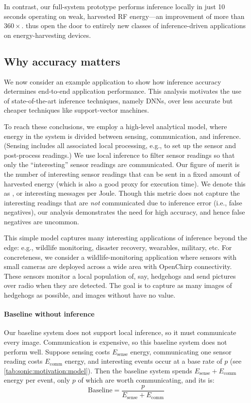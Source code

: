 In contrast, our full-system \sonic prototype performs inference locally
in just 10 seconds operating on weak, harvested RF energy---an
improvement of more than $360\times$. 
%
\sonictails thus open the door to entirely new classes of inference-driven
applications on energy-harvesting devices.

\subsection{Why accuracy matters}

We now consider an example application to show how
inference accuracy determines end-to-end application performance.
%
This analysis motivates the use of state-of-the-art inference
techniques, namely DNNs, over less accurate but
cheaper techniques like support-vector machines.

To reach these conclusions, we employ a high-level analytical model,
where energy in the system is divided between
sensing, communication, and inference.
%
(Sensing includes all associated local processing, e.g., to set up the
sensor and post-process readings.)
%
We use local inference to filter sensor readings so that only the
``interesting'' sensor readings are communicated.
%
Our figure of merit is the number of interesting sensor readings
that can be sent in a fixed amount of harvested energy
(which is also a good proxy for execution time).
%
We denote this as \metric, or interesting messages per Joule.
%
Though this metric does not capture the interesting readings that are
\emph{not} communicated due to inference error (i.e., false
negatives), our analysis demonstrates the need for high accuracy,
and hence false negatives are uncommon.

This simple model captures many interesting applications of inference
beyond the edge: e.g., wildlife monitoring, disaster recovery,
wearables, military, etc.
%
For concreteness, we consider a wildlife-monitoring application where
sensors with small cameras are deployed across a wide area with
OpenChirp connectivity.
%
These sensors monitor a local population of, say, hedgehogs and send
pictures over radio when they are detected.
%
The goal is to capture as many images of hedgehogs as
possible, and images without have no value.

\paragraph{Baseline without inference}
Our baseline system does not support local inference, so it must
communicate every image.
%
Communication is expensive, so this baseline
system does not perform well.
%
Suppose sensing costs $E_\text{sense}$ energy,
communicating one sensor reading costs $E_\text{comm}$ energy,
and interesting events occur at a base rate of $p$
(see \autoref{tab:sonic:motivation:model}).
%
Then the baseline system spends $E_\text{sense} + E_\text{comm}$ energy per
event, only $p$ of which are worth communicating, and its \metric is:
\begin{equation}
  \text{Baseline} = \frac{p}{E_\text{sense} + E_\text{comm}}
\end{equation}

